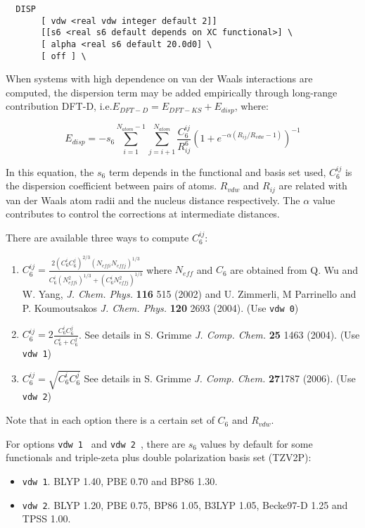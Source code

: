 \begin{verbatim}
  DISP 
       [ vdw <real vdw integer default 2]]
       [[s6 <real s6 default depends on XC functional>] \
       [ alpha <real s6 default 20.0d0] \
       [ off ] \
\end{verbatim}

When systems with high dependence on van der Waals interactions
are computed, the dispersion term may be added empirically 
through long-range contribution 
DFT-D, i.e.$ E_{DFT-D}=E_{DFT-KS}+E_{disp}$,
where:

$$ E_{disp}=-s_6\sum^{N_{atom}-1}_{i=1}\sum^{N_{atom}}_{j=i+1} 
\frac{C_{6}^{ij}}{R_{ij}^{6}}
\left( 1+e^{-\alpha (R_{ij}/R_{vdw}-1)}  \right)^{-1}$$

In this equation, the $s_6$ term depends in the functional and basis set used, $C_6^{ij}$ 
is the dispersion coefficient between pairs of atoms.
$R_{vdw}$ and $R_{ij}$ are related with van der Waals atom radii and
the nucleus distance respectively. The $\alpha$ value contributes to control the corrections
at intermediate distances.

There are available three ways to compute $C_6^{ij}$:
\begin{enumerate}
\item   $C_6^{ij}=
\frac{2(C_6^{i}C_6^{j})^{2/3}(N_{eff i}N_{eff j})^{1/3}}
{C_6^{i}(N_{eff i}^2)^{1/3}+(C_6^{i}N_{eff j}^2)^{1/3}}$ 
where $N_{eff}$ and $C_6$ are obtained from Q. Wu and W. Yang, \textit{J. Chem. Phys.} 
\textbf{116} 515 (2002) and U. Zimmerli, M Parrinello and P. Koumoutsakos 
\textit{J. Chem. Phys.} \textbf{120} 2693 (2004). (Use {\tt vdw 0})

\item $C_6^{ij}=2\frac{C_6^{i}C_6^{j}}{C_6^{i}+C_6^{j}}$.
See details in 
S. Grimme \textit{J. Comp. Chem.} \textbf{25} 1463 (2004).
(Use {\tt vdw 1})

\item $C_6^{ij}=\sqrt{C_6^{i}C_6^{j}}$
See details in 
S. Grimme \textit{J. Comp. Chem.} \textbf{27}1787 (2006).
(Use {\tt vdw 2})

\end{enumerate}

Note that in each option there is a certain set of $C_6$ and $R_{vdw}$.

For options {\tt vdw 1 } and {\tt vdw 2 }, there are $s_6$ values by default for some functionals 
and triple-zeta plus double polarization basis set (TZV2P):
\begin{itemize}
\item {\tt vdw 1}. BLYP 1.40, PBE 0.70 and BP86 1.30.
\item {\tt vdw 2}. BLYP 1.20, PBE 0.75, BP86 1.05, B3LYP 1.05, Becke97-D 1.25 and TPSS 1.00.
\end{itemize}

